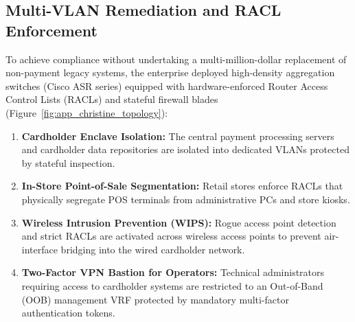 \subsection{Multi-VLAN Remediation and RACL Enforcement}
To achieve compliance without undertaking a multi-million-dollar replacement of non-payment legacy systems, the enterprise deployed high-density aggregation switches (Cisco ASR series) equipped with hardware-enforced Router Access Control Lists (RACLs) and stateful firewall blades (Figure~\ref{fig:app_christine_topology}):
\begin{enumerate}
    \item \textbf{Cardholder Enclave Isolation:} The central payment processing servers and cardholder data repositories are isolated into dedicated VLANs protected by stateful inspection.
    \item \textbf{In-Store Point-of-Sale Segmentation:} Retail stores enforce RACLs that physically segregate POS terminals from administrative PCs and store kiosks.
    \item \textbf{Wireless Intrusion Prevention (WIPS):} Rogue access point detection and strict RACLs are activated across wireless access points to prevent air-interface bridging into the wired cardholder network.
    \item \textbf{Two-Factor VPN Bastion for Operators:} Technical administrators requiring access to cardholder systems are restricted to an Out-of-Band (OOB) management VRF protected by mandatory multi-factor authentication tokens.
\end{enumerate}
